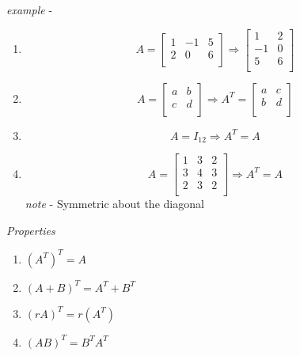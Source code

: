 \documentclass{article}
\begin{document}
\emph{example} -
\begin{enumerate}
\item\[ A = \left[
       \begin{array}{ccc}
         1 & -1 & 5 \\
         2 & 0 & 6 \\
       \end{array}
     \right]
     \Rightarrow
     \left[
       \begin{array}{cc}
         1 & 2 \\
         -1 & 0 \\
         5 & 6 \\
       \end{array}
     \right]
\]

\item\[ A=\left[
          \begin{array}{cc}
             a & b \\
             c & d \\
          \end{array}
          \right]
          \Rightarrow
          A^T=
          \left[
          \begin{array}{cc}
             a & c \\
             b & d \\
          \end{array}
          \right]
          \]
\item\[ A=I_{12} \Rightarrow A^T = A \]

\item\[ A=\left[
          \begin{array}{ccc}
             1 & 3 & 2 \\
             3 & 4 & 3 \\
             2 & 3 & 2 \\
          \end{array}
          \right]
          {\Rightarrow}A^T=A \]
          \emph{note} - Symmetric about the diagonal
\end{enumerate}

\emph{Properties}
\begin{enumerate}
  \item $(A^T)^T=A$
  \item $(A+B)^T=A^T+B^T$
  \item $(rA)^T=r(A^T)$
  \item $(AB)^T=B^TA^T$
\end{enumerate}
\end{document}
